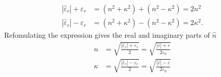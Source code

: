 \begin{align}
   |\hat{\varepsilon}_r| + \varepsilon_r &= (n^2 + \kappa^2) + (n^2 - \kappa^2) = 2n^2\\
   |\hat{\varepsilon}_r| - \varepsilon_r &= (n^2 + \kappa^2) - (n^2 - \kappa^2) = 2\kappa^2.
\end{align}
Refomulating the expression gives the real and imaginary parts of $\hat{n}$
\begin{align}
   n      &= \sqrt{ \frac{|\hat{\varepsilon}_r| + \varepsilon_r}{2}} 
           = \sqrt{ \frac{|\hat{\varepsilon}| + \varepsilon}{2\varepsilon_0}}\\
   \kappa &= \sqrt{ \frac{|\hat{\varepsilon}_r| - \varepsilon_r}{2}} 
           = \sqrt{ \frac{|\hat{\varepsilon}| - \varepsilon}{2\varepsilon_0}}
\end{align}



